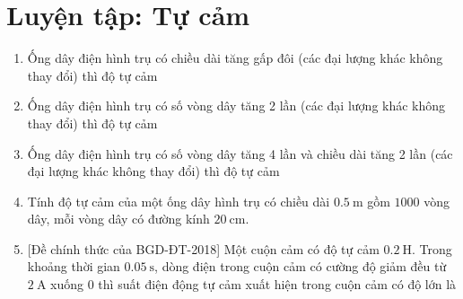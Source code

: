 \chapter{Luyện tập: Tự cảm}
\begin{enumerate}
	\item
	{
		Ống dây điện hình trụ có chiều dài tăng gấp đôi (các đại lượng khác không thay đổi) thì độ tự cảm
	}
	\item
	{
		Ống dây điện hình trụ có số vòng dây tăng 2 lần (các đại lượng khác không thay đổi) thì độ tự cảm
	}
	\item
	{
		Ống dây điện hình trụ có số vòng dây tăng 4 lần và chiều dài tăng 2 lần (các đại lượng khác không thay đổi) thì độ tự cảm
	}
	\item
	{
		Tính độ tự cảm của một ống dây hình trụ có chiều dài $\SI{0.5}{\meter}$ gồm $1000$ vòng dây, mỗi vòng dây có đường kính $\SI{20}{\centi \meter}$.
	}
	\item
	{
		[Đề chính thức của BGD-ĐT-2018] Một cuộn cảm có độ tự cảm $\SI{0.2}{\henry}$. Trong khoảng thời gian $\SI{0.05}{\second}$, dòng điện trong cuộn cảm có cường độ giảm đều từ $\SI{2}{\ampere}$ xuống $0$ thì suất điện động tự cảm xuất hiện trong cuộn cảm có độ lớn là
}
\end{enumerate}

